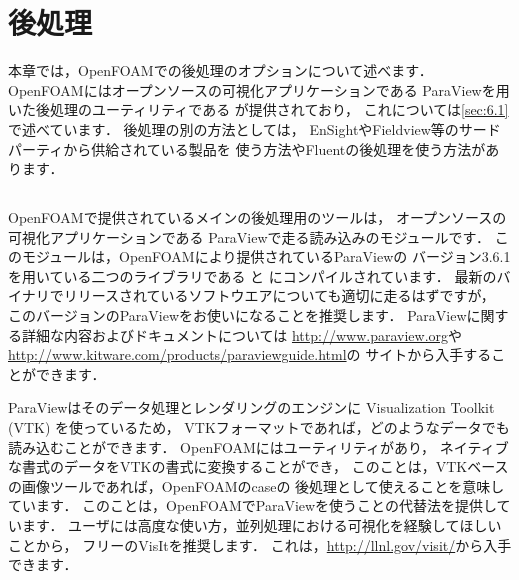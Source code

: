\chapter{後処理}
\label{chap:6}
%
本章では，OpenFOAMでの後処理のオプションについて述べます．
OpenFOAMにはオープンソースの可視化アプリケーションである
ParaViewを用いた後処理のユーティリティである
が提供されており，
これについては\autoref{sec:6.1}で述べています．
後処理の別の方法としては，
EnSightやFieldview等のサードパーティから供給されている製品を
使う方法やFluentの後処理を使う方法があります．



\section{}
\label{sec:6.1}
%
%
%
%
%
%
OpenFOAMで提供されているメインの後処理用のツールは，
オープンソースの可視化アプリケーションである
ParaViewで走る読み込みのモジュールです．
このモジュールは，OpenFOAMにより提供されているParaViewの
バージョン3.6.1を用いている二つのライブラリである
%
%
と
%
%
にコンパイルされています．
最新のバイナリでリリースされているソフトウエアについても適切に走るはずですが，
このバージョンのParaViewをお使いになることを推奨します．
ParaViewに関する詳細な内容およびドキュメントについては
\url{http://www.paraview.org}や
\url{http://www.kitware.com/products/paraviewguide.html}の
サイトから入手することができます．

ParaViewはそのデータ処理とレンダリングのエンジンに
Visualization Toolkit (VTK) を使っているため，
VTKフォーマットであれば，どのようなデータでも読み込むことができます．
OpenFOAMにはユーティリティがあり，
ネイティブな書式のデータをVTKの書式に変換することができ，
このことは，VTKベースの画像ツールであれば，OpenFOAMのcaseの
後処理として使えることを意味しています．
このことは，OpenFOAMでParaViewを使うことの代替法を提供しています．
ユーザには高度な使い方，並列処理における可視化を経験してほしいことから，
フリーのVisItを推奨します．
これは，\url{http://llnl.gov/visit/}から入手できます．

